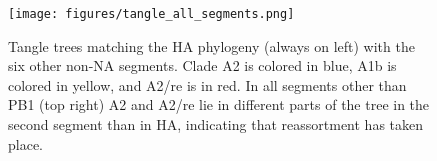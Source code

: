 \begin{figure}[b]
    \begin{center}
    \texttt{[image: figures/tangle\_all\_segments.png]}
    \end{center}
    \caption{Tangle trees matching the HA phylogeny (always on left) with the six other non-NA segments. Clade A2 is colored in blue, A1b is colored in yellow, and A2/re is in red. In all segments other than PB1 (top right) A2 and A2/re lie in different parts of the tree in the second segment than in HA, indicating that reassortment has taken place.}
    \label{sup_fig:all_tangle}
\end{figure}
